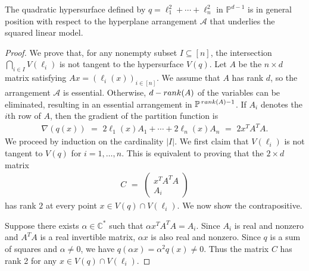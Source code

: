 \documentclass[10pt,a4paper]{amsart}
\newcommand{\CC}{\mathbb{C}}
\newcommand{\PP}{\mathbb{P}}
\begin{document}
\begin{lemma}\label{lem:generic_quadric}
    The quadratic hypersurface defined by
     $q = \ell_1^2 + \cdots + \ell_n^2$ in $\PP^{d-1}$ is in general position with respect to the hyperplane arrangement 
     $\mathcal A$ that underlies the squared linear model.
     \end{lemma}

\begin{proof}
  We prove that, for any nonempty subset $I \subseteq [n]$, the intersection $ \bigcap_{i \in I} V(\ell_i)$
    is  not tangent  to the hypersurface $V(q)$.
  Let $A $ be the $n \times d$ matrix satisfying $Ax = (\ell_i(x))_{i \in [n]}$.
  We assume that $A$ has rank $d$, so the  arrangement $\mathcal A$ is essential. 
  Otherwise, $d - {\rm rank}(A)$ of the variables can be eliminated, resulting in an essential arrangement in $\PP^{\,{\rm rank}(A) - 1}$. 
    If $A_i$ denotes the $i$th row of $A$, then the gradient of the partition function is 
  \begin{align*}
    \nabla (q(x)) \,\,= \,\,2\ell_1(x) A_1 + \cdots + 2\ell_n(x) A_n     \,\, = \,\,2x^T A^T A.
  \end{align*}
  We proceed by induction on  the cardinality $|I|$.
    We first claim that $V(\ell_i)$ is not tangent to $V(q)$ for $i = 1, \ldots, n$.
  This is equivalent to proving that the $2 \times d$ matrix
    \begin{align*}
    C \,\,= \,\,\begin{pmatrix}
      x^T A^T A\\
      A_i
    \end{pmatrix}
  \end{align*}
    has rank $2$ at every point $x \in V(q) \cap V(\ell_i)$. We now show the contrapositive.
    
  Suppose there exists  $\alpha \in \CC^*$ such that $\alpha x^T A^T A = A_i$.
  Since $A_i$ is real and nonzero and $A^TA$ is a real invertible matrix, $\alpha x$ is also real and nonzero.
  Since $q$ is a sum of squares and $\alpha \neq 0$, we have $q(\alpha x) = \alpha^2 q(x) \neq 0$.
  Thus the matrix $C$ has rank 2 for any $x \in V(q) \cap V(\ell_i)$.


\end{proof}
\end{document}
